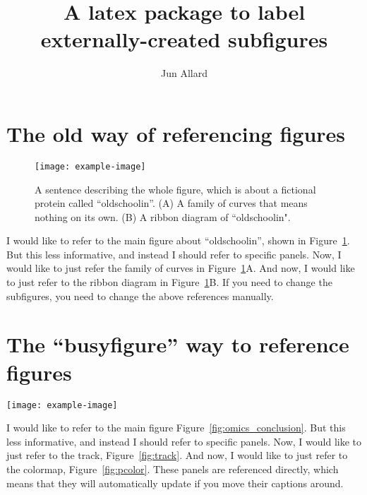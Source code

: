 \documentclass[onecolumn,11pt]{article}
\title{A latex package to label externally-created subfigures}
\author[a]{Jun Allard}
\affil[a]{University of California Irvine}
\date{} %
\begin{document}
\maketitle



\section{The old way of referencing figures}


\begin{figure}[ht]
        \centering
        \texttt{[image: example-image]} 
        \caption{A sentence describing the whole figure, which is about a fictional protein called ``oldschoolin''.
        (A) A family of curves that means nothing on its own.
        (B) A ribbon diagram of ``oldschoolin".
        \label{fig:oldschool}}
\end{figure}

I would like to refer to the main figure about ``oldschoolin'', shown in Figure~\ref{fig:oldschool}. 
But this less informative, and instead I should refer to specific panels.
Now, I would like to just refer the family of curves in Figure~\ref{fig:oldschool}A.
And now, I would like to just refer to the ribbon diagram in Figure~\ref{fig:oldschool}B.
If you need to change the subfigures, you need to change the above references manually.


\clearpage

\section{The ``busyfigure'' way to reference figures}

\begin{busyfigure}[ht]
        \centering
        \texttt{[image: example-image]} 
\end{busyfigure}

I would like to refer to the main figure Figure~\ref{fig:omics_conclusion}. 
But this less informative, and instead I should refer to specific panels.
Now, I would like to just refer to the track, Figure~\ref{fig:track}.
And now, I would like to just refer to the colormap, Figure~\ref{fig:pcolor}.
These panels are referenced directly, which means that they will automatically update if you move their captions around.
\end{document}
